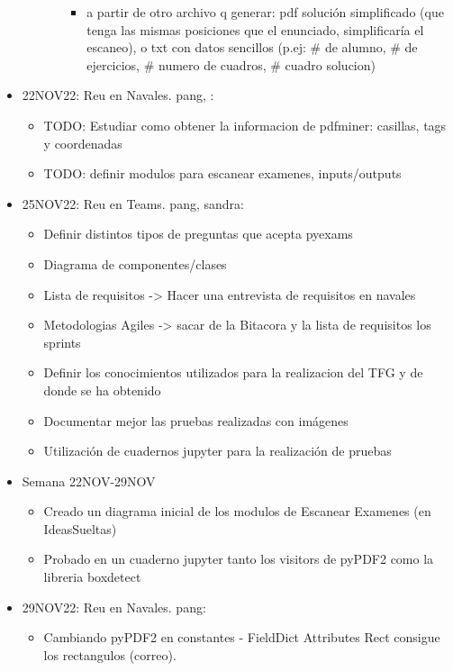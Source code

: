 \begin{itemize}
\begin{itemize}
\begin{itemize}
\begin{itemize}
                \item a partir de otro archivo q generar: pdf solución simplificado (que tenga las mismas posiciones que el enunciado, simplificaría el escaneo), o txt con datos sencillos (p.ej: \# de alumno, \# de ejercicios, \# numero de cuadros, \# cuadro solucion)
            \end{itemize}
        \end{itemize}
    \end{itemize}
    \item 22NOV22: Reu en Navales. pang, :
    \begin{itemize}
        \item TODO: Estudiar como obtener la informacion de pdfminer: casillas, tags y coordenadas
        \item TODO: definir modulos para escanear examenes, inputs/outputs
    \end{itemize}
    \item 25NOV22: Reu en Teams. pang, sandra:
    \begin{itemize}
        \item Definir distintos tipos de preguntas que acepta pyexams
        \item Diagrama de componentes/clases
        \item Lista de requisitos -> Hacer una entrevista de requisitos en navales
        \item Metodologias Agiles -> sacar de la Bitacora y la lista de requisitos los sprints
        \item Definir los conocimientos utilizados para la realizacion del TFG y de donde se ha obtenido 
        \item Documentar mejor las pruebas realizadas con imágenes
        \item Utilización de cuadernos jupyter para la realización de pruebas
    \end{itemize}
    \item Semana 22NOV-29NOV
    \begin{itemize}
        \item Creado un diagrama inicial de los modulos de Escanear Examenes (en IdeasSueltas)
        \item Probado en un cuaderno jupyter tanto los visitors de pyPDF2 como la libreria boxdetect
    \end{itemize}
    \item 29NOV22: Reu en Navales. pang:
    \begin{itemize}
        \item Cambiando pyPDF2 en constantes - FieldDict Attributes Rect consigue los rectangulos (correo).

\end{itemize}
\end{itemize}
